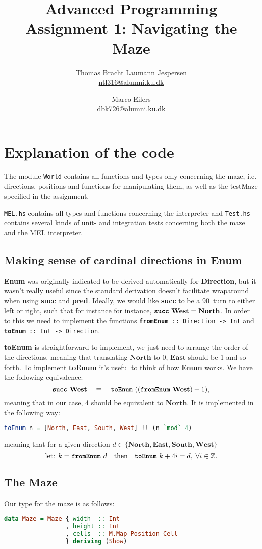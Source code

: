 \documentclass[a4paper]{article}
\title{Advanced Programming\\
Assignment 1: Navigating the Maze}
\author{Thomas Bracht Laumann Jespersen\\ \url{ntl316@alumni.ku.dk} \and Marco Eilers\\ \url{dbk726@alumni.ku.dk} }
\newcommand{\west}{\ensuremath{\textbf{West}}\xspace}
\newcommand{\east}{\ensuremath{\textbf{East}}\xspace}
\newcommand{\south}{\ensuremath{\textbf{South}}\xspace}
\newcommand{\north}{\ensuremath{\textbf{North}}\xspace}
\newcommand{\suc}{\textbf{\ttfamily succ}\xspace}
\newcommand{\prd}{\textbf{\ttfamily pred}\xspace}
\newcommand{\src}[1]{\texttt{#1}\xspace}
\newcommand{\func}[1]{\textbf{\ttfamily #1}\xspace}
\newcommand{\functype}[2]{\mbox{\texttt{\scriptsize\textbf{#1} ::\ #2}}\xspace}
\begin{document}
\maketitle


\section{Explanation of the code}
The module \src{World} contains all functions and types only concerning the maze, i.e. directions, positions and functions for manipulating them, as well as the testMaze specified in the assignment. 

\src{MEL.hs} contains all types and functions concerning the interpreter and \src{Test.hs} contains several kinds of unit- and integration tests concerning both the maze and the MEL interpreter.

\subsection{Making sense of cardinal directions in \func{Enum}}
\func{Enum} was originally indicated to be derived automatically for \func{Direction}, but it wasn't really useful since the standard derivation doesn't facilitate wraparound when using \suc and \prd. Ideally, we would like \suc to be a 90\textdegree\ turn to either left or right, such that for instance for instance, $\text{\suc\ }\west = \north$. In order to this we need to implement the functions \functype{fromEnum}{Direction -> Int} and \functype{toEnum}{Int -> Direction}.

\func{toEnum} is straightforward to implement, we just need to arrange the order of the directions, meaning that translating \north to 0, \east should be 1 and so forth. To implement \func{toEnum} it's useful to think of how \func{Enum} works. We have the following equivalence:
\[
\text{\suc\ } \west\quad\equiv\quad\text{\func{toEnum} } ((\text{\func{fromEnum} } \west) + 1),
\]
meaning that in our case, 4 should be equivalent to \north. It is implemented in the following way:
\begin{lstlisting}[language=haskell]
  toEnum n = [North, East, South, West] !! (n `mod` 4)
\end{lstlisting}
meaning that for a given direction $d\in\{\north,\east,\south,\west \}$
\[
\text{let: } k = \text{\func{fromEnum} } d\quad\text{then}\quad\text{\func{toEnum} } k + 4i = d,\;\forall i\in\mathbb{Z}.
\]

\subsection{The Maze}
Our type for the maze is as follows:
\begin{lstlisting}[language=haskell]
data Maze = Maze { width  :: Int
                 , height :: Int
                 , cells  :: M.Map Position Cell
                 } deriving (Show)
\end{lstlisting}
\end{document}
